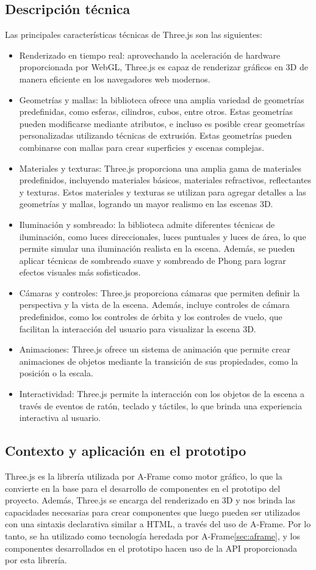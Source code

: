 \documentclass[a4paper, 11pt]{book}
\begin{document}
\subsection{Descripción técnica}
Las principales características técnicas de Three.js son las siguientes:
\begin{itemize}
\item Renderizado en tiempo real: aprovechando la aceleración de hardware proporcionada por WebGL, Three.js es capaz de renderizar gráficos en 3D de manera eficiente en los navegadores web modernos.
\item Geometrías y mallas: la biblioteca ofrece una amplia variedad de geometrías predefinidas, como esferas, cilindros, cubos, entre otros. Estas geometrías pueden modificarse mediante atributos, e incluso es posible crear geometrías personalizadas utilizando técnicas de extrusión. Estas geometrías pueden combinarse con mallas para crear superficies y escenas complejas.
\item Materiales y texturas: Three.js proporciona una amplia gama de materiales predefinidos, incluyendo materiales básicos, materiales refractivos, reflectantes y texturas. Estos materiales y texturas se utilizan para agregar detalles a las geometrías y mallas, logrando un mayor realismo en las escenas 3D.
\item Iluminación y sombreado: la biblioteca admite diferentes técnicas de iluminación, como luces direccionales, luces puntuales y luces de área, lo que permite simular una iluminación realista en la escena. Además, se pueden aplicar técnicas de sombreado suave y sombreado de Phong para lograr efectos visuales más sofisticados.
\item Cámaras y controles: Three.js proporciona cámaras que permiten definir la perspectiva y la vista de la escena. Además, incluye controles de cámara predefinidos, como los controles de órbita y los controles de vuelo, que facilitan la interacción del usuario para visualizar la escena 3D.
\item Animaciones: Three.js ofrece un sistema de animación que permite crear animaciones de objetos mediante la transición de sus propiedades, como la posición o la escala.
\item Interactividad: Three.js permite la interacción con los objetos de la escena a través de eventos de ratón, teclado y táctiles, lo que brinda una experiencia interactiva al usuario.
\end{itemize}
\subsection{Contexto y aplicación en el prototipo}
Three.js es la librería utilizada por A-Frame como motor gráfico, lo que la convierte en la base para el desarrollo de componentes en el prototipo del proyecto. Además, Three.js se encarga del renderizado en 3D y nos brinda las capacidades necesarias para crear componentes que luego pueden ser utilizados con una sintaxis declarativa similar a HTML, a través del uso de A-Frame. Por lo tanto, se ha utilizado como tecnología heredada por A-Frame\ref{sec:aframe}, y los componentes desarrollados en el prototipo hacen uso de la API proporcionada por esta librería.
\end{document}
